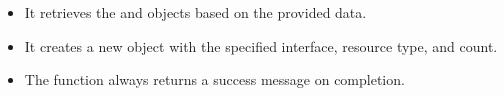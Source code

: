 \documentclass[letterpaper,10pt,english]{sphinxmanual}
\begin{document}
\begin{fulllineitems}
\begin{description}
\begin{itemize}
\item {} 
\sphinxAtStartPar
It retrieves the  and  objects based on the provided data.

\item {} 
\sphinxAtStartPar
It creates a new  object with the specified interface, resource type, and count.

\item {} 
\sphinxAtStartPar
The function always returns a success message on completion.

\end{itemize}

\end{description}

\end{fulllineitems}

\end{document}
